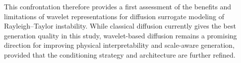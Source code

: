 This confrontation therefore provides a first assessment of the benefits and
limitations of wavelet representations for diffusion surrogate modeling of
Rayleigh--Taylor instability. While classical diffusion currently gives the
best generation quality in this study, wavelet-based diffusion remains a
promising direction for improving physical interpretability and scale-aware
generation, provided that the conditioning strategy and architecture are further
refined.
